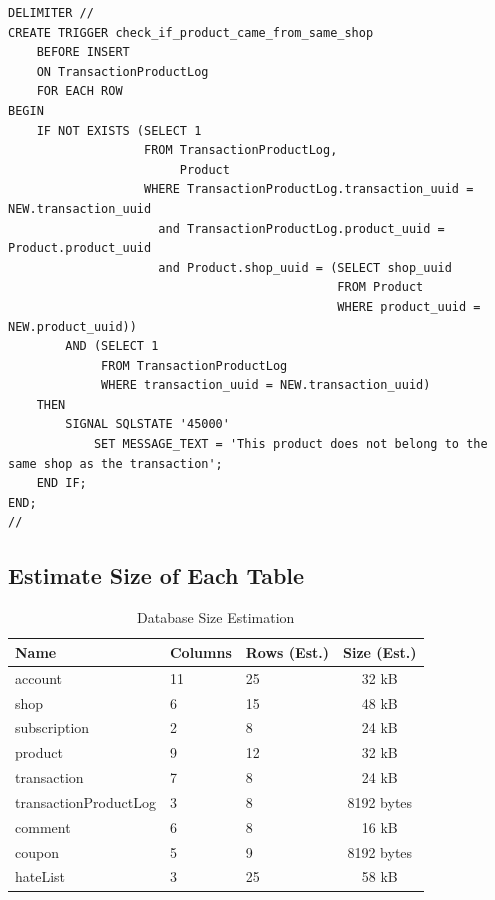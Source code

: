 \documentclass[a4paper, 12pt]{article}
\newcommand\NormalFont{\fontsize{12pt}{16pt}\selectfont}
\begin{document}
\begin{lstlisting}
DELIMITER //
CREATE TRIGGER check_if_product_came_from_same_shop
    BEFORE INSERT
    ON TransactionProductLog
    FOR EACH ROW
BEGIN
    IF NOT EXISTS (SELECT 1
                   FROM TransactionProductLog,
                        Product
                   WHERE TransactionProductLog.transaction_uuid = NEW.transaction_uuid
                     and TransactionProductLog.product_uuid = Product.product_uuid
                     and Product.shop_uuid = (SELECT shop_uuid
                                              FROM Product
                                              WHERE product_uuid = NEW.product_uuid))
        AND (SELECT 1
             FROM TransactionProductLog
             WHERE transaction_uuid = NEW.transaction_uuid)
    THEN
        SIGNAL SQLSTATE '45000'
            SET MESSAGE_TEXT = 'This product does not belong to the same shop as the transaction';
    END IF;
END;
//
\end{lstlisting}
\newpage
\NormalFont
\subsection{Estimate Size of Each Table}
\begin{table}[h]
    \renewcommand{\arraystretch}{1.35}
    \begin{tabular}{|p{5cm}|p{2cm}|p{2.5cm}|c|}
        \hline
        \textbf{Name} & \textbf{Columns} & \textbf{Rows (Est.)} & \textbf{Size (Est.)} \\
        \hline
        account & 11 & 25 & 32 kB \\
        \hline
        shop & 6 & 15 & 48 kB \\
        \hline
        subscription   & 2 & 8 & 24 kB \\
        \hline
        product & 9 & 12 & 32 kB \\
        \hline
        transaction & 7 & 8 & 24 kB \\
        \hline
        transactionProductLog & 3 & 8 & 8192 bytes \\
        \hline
        comment & 6 & 8 & 16 kB \\
        \hline
        coupon & 5 & 9 & 8192 bytes \\
        \hline
        hateList & 3 & 25 & 58 kB \\
        \hline
    \end{tabular}
    \caption{Database Size Estimation}
    \label{tab:database-size-estimation}
\end{table}
\end{document}
